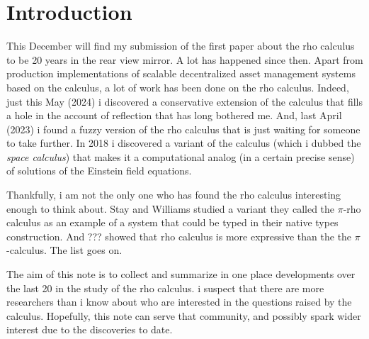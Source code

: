\section{Introduction}\label{sec:introduction} %
This December will find my submission of the first paper about the rho
calculus to be 20 years in the rear view mirror. A lot has happened
since then. Apart from production implementations of scalable
decentralized asset management systems based on the calculus, a lot of
work has been done on the rho calculus. Indeed, just this May (2024) i
discovered a conservative extension of the calculus that fills a hole
in the account of reflection that has long bothered me. And, last
April (2023) i found a fuzzy version of the rho calculus that is just
waiting for someone to take further. In 2018 i discovered a variant of
the calculus (which i dubbed the \emph{space calculus}) that makes it
a computational analog (in a certain precise sense) of solutions of
the Einstein field equations.

Thankfully, i am not the only one who has found the rho calculus
interesting enough to think about. Stay and Williams studied a variant
they called the $\pi$-rho calculus as an example of a system that could
be typed in their native types construction. And ??? showed that rho
calculus is more expressive than the the $\pi$-calculus. The list goes on.

The aim of this note is to collect and summarize in one place
developments over the last 20 in the study of the rho calculus. i
suspect that there are more researchers than i know about who are
interested in the questions raised by the calculus. Hopefully, this
note can serve that community, and possibly spark wider interest due to
the discoveries to date.

